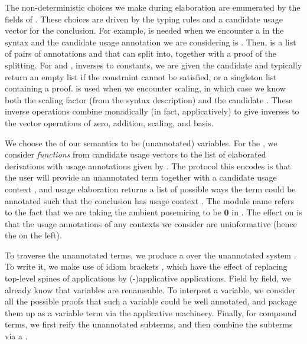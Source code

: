 The non-deterministic choices we make during elaboration are enumerated by
the fields of .
These choices are driven by the typing rules and a candidate usage vector for
the conclusion.
For example, \AgdaSpace{} is needed when we
encounter a  in the syntax and the candidate
usage annotation we are considering is .
Then, \AgdaSpace{} is a list of pairs of
annotations  and  that  can split into,
together with a proof of the splitting.
For  and , inverses to constants,
we are given the candidate  and typically return an empty list if
the constraint cannot be satisfied, or a singleton list containing a proof.
 is used when we encounter scaling, in which case we know
both the scaling factor  (from the syntax description) and the
candidate .
These inverse operations combine monadically (in fact, applicatively) to give
inverses to the vector operations of zero, addition, scaling, and basis.


We choose the \AgdaBound{$\V$} of our semantics to be (unannotated) variables.
For the \AgdaBound{$\C$}, we consider \emph{functions} from candidate usage
vectors  to the list of elaborated derivations with usage
annotations given by .
The protocol this encodes is that the user will provide an unannotated term
together with a candidate usage context , and usage elaboration
returns a list of possible ways the term could be annotated such that the
conclusion has usage context .
The module name  refers to the fact that we are taking the
ambient posemiring to be $\mathbf0$ in .
The effect on  is that the usage annotations of any
contexts we consider are uninformative (hence the \AgdaSymbol{\_} on the left).


To traverse the unannotated terms, we produce a  over the
unannotated system \AgdaSpace{}.
To write it, we make use of idiom brackets
\AgdaSymbol{(|}\AgdaSpace{}\AgdaSymbol{$\ldots$}\AgdaSpace{}\AgdaSymbol{|)},
which have the effect of replacing top-level spines of applications by
(-)applicative applications.
Field by field, we already know that variables are renameable.
To interpret a variable, we consider all the possible proofs that such a
variable could be well annotated, and package them up as a variable term via
the applicative machinery.
Finally, for compound terms, we first reify the unannotated subterms, and then
combine the subterms via a .

